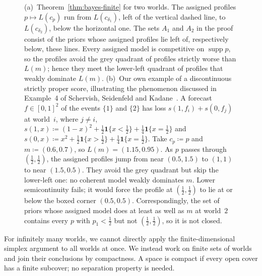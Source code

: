 \documentclass[11pt]{article}
\theoremstyle{definition}
\theoremstyle{remark}
\newcommand{\one}{\mathbf 1}
\newcommand{\supp}{\operatorname{supp}}
\begin{document}
\begin{figure}[ht]
\caption{(a)~Theorem~\ref{thm:bayes-finite} for two worlds. The assigned profiles $p\mapsto L(c_p)$ run from $L(c_{\delta_1})$, left of the vertical dashed line, to $L(c_{\delta_2})$, below the horizontal one. The sets $A_1$ and $A_2$ in the proof consist of the priors whose assigned profiles lie left of, respectively below, these lines. Every assigned model is competitive on $\supp p$, so the profiles avoid the grey quadrant of profiles strictly worse than $L(m)$; hence they meet the lower-left quadrant of profiles that weakly dominate $L(m)$. (b)~Our own example of a discontinuous strictly proper score, illustrating the phenomenon discussed in Example~4 of Schervish, Seidenfeld and Kadane~\cite{SSK09}. A forecast $f\in[0,1]^2$ of the events $\{1\}$ and $\{2\}$ has loss $s(1,f_i)+s(0,f_j)$ at world~$i$, where $j\ne i$, $s(1,x)\coloneqq(1-x)^2+\frac12\one\{x<\frac12\}+\frac14\one\{x=\frac12\}$ and $s(0,x)\coloneqq x^2+\frac12\one\{x>\frac12\}+\frac14\one\{x=\frac12\}$. Take $c_p\coloneqq p$ and $m\coloneqq(0.6,0.7)$, so $L(m)=(1.15,0.95)$. As $p$ passes through $(\frac12,\frac12)$, the assigned profiles jump from near $(0.5,1.5)$ to $(1,1)$ to near $(1.5,0.5)$. They avoid the grey quadrant but skip the lower-left one: no coherent model weakly dominates $m$. Lower semicontinuity fails; it would force the profile at $(\frac12,\frac12)$ to lie at or below the boxed corner $(0.5,0.5)$. Correspondingly, the set of priors whose assigned model does at least as well as $m$ at world~$2$ contains every $p$ with $p_1<\frac12$ but not $(\frac12,\frac12)$, so it is not closed.}
\label{fig:profiles}
\end{figure}

For infinitely many worlds, we cannot directly apply the finite-dimensional simplex argument to all worlds at once. We instead work on finite sets of worlds and join their conclusions by compactness. A space is compact if every open cover has a finite subcover; no separation property is needed.
\end{document}
